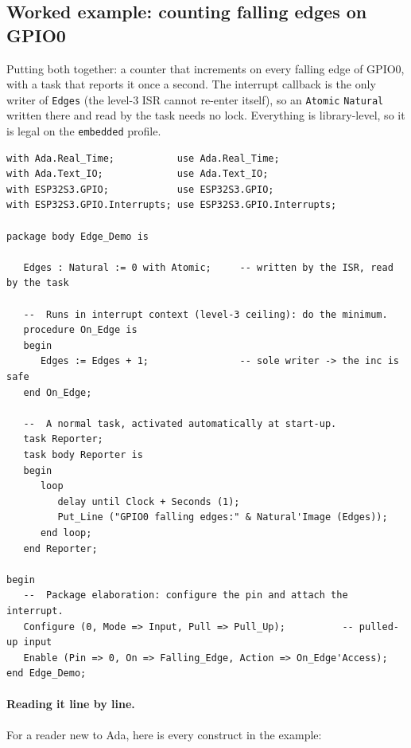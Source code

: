 \subsection{Worked example: counting falling edges on GPIO0}

Putting both together: a counter that increments on every falling edge of GPIO0,
with a task that reports it once a second. The interrupt callback is the only
writer of \texttt{Edges} (the level-3 ISR cannot re-enter itself), so an
\texttt{Atomic} \texttt{Natural} written there and read by the task needs no lock.
Everything is library-level, so it is legal on the \texttt{embedded} profile.

\begin{lstlisting}
with Ada.Real_Time;           use Ada.Real_Time;
with Ada.Text_IO;             use Ada.Text_IO;
with ESP32S3.GPIO;            use ESP32S3.GPIO;
with ESP32S3.GPIO.Interrupts; use ESP32S3.GPIO.Interrupts;

package body Edge_Demo is

   Edges : Natural := 0 with Atomic;     -- written by the ISR, read by the task

   --  Runs in interrupt context (level-3 ceiling): do the minimum.
   procedure On_Edge is
   begin
      Edges := Edges + 1;                -- sole writer -> the inc is safe
   end On_Edge;

   --  A normal task, activated automatically at start-up.
   task Reporter;
   task body Reporter is
   begin
      loop
         delay until Clock + Seconds (1);
         Put_Line ("GPIO0 falling edges:" & Natural'Image (Edges));
      end loop;
   end Reporter;

begin
   --  Package elaboration: configure the pin and attach the interrupt.
   Configure (0, Mode => Input, Pull => Pull_Up);          -- pulled-up input
   Enable (Pin => 0, On => Falling_Edge, Action => On_Edge'Access);
end Edge_Demo;
\end{lstlisting}

\paragraph{Reading it line by line.} For a reader new to Ada, here is every
construct in the example:

